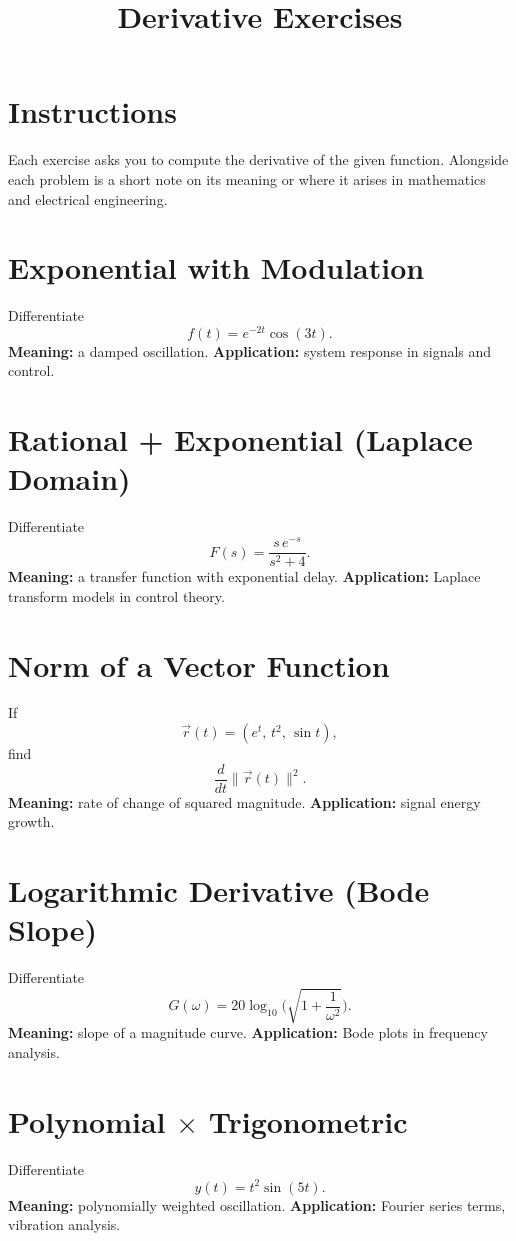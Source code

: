 \documentclass[11pt,a4paper]{article}
\title{Derivative Exercises}
\author{}
\date{}
\begin{document}
	\maketitle
	
	\section*{Instructions}
	Each exercise asks you to compute the derivative of the given function.
	Alongside each problem is a short note on its meaning or where it arises
	in mathematics and electrical engineering.
	
	\bigskip
	
	\section{Exponential with Modulation}
	Differentiate
	$$
	f(t) = e^{-2t}\cos(3t).
	$$
	\textbf{Meaning:} a damped oscillation.  
	\textbf{Application:} system response in signals and control.
	
	\section{Rational + Exponential (Laplace Domain)}
	Differentiate
	$$
	F(s) = \frac{s\,e^{-s}}{s^2+4}.
	$$
	\textbf{Meaning:} a transfer function with exponential delay.  
	\textbf{Application:} Laplace transform models in control theory.
	
	\section{Norm of a Vector Function}
	If
	$$
	\vec{r}(t) = (e^t,\, t^2,\, \sin t),
	$$
	find
	$$
	\frac{d}{dt}\|\vec{r}(t)\|^2.
	$$
	\textbf{Meaning:} rate of change of squared magnitude.  
	\textbf{Application:} signal energy growth.
	
	\section{Logarithmic Derivative (Bode Slope)}
	Differentiate
	$$
	G(\omega) = 20\log_{10}\!\Bigg(\sqrt{1+\frac{1}{\omega^2}}\Bigg).
	$$
	\textbf{Meaning:} slope of a magnitude curve.  
	\textbf{Application:} Bode plots in frequency analysis.
	
	\section{Polynomial $\times$ Trigonometric}
	Differentiate
	$$
	y(t) = t^2 \sin(5t).
	$$
	\textbf{Meaning:} polynomially weighted oscillation.  
	\textbf{Application:} Fourier series terms, vibration analysis.
	
\end{document}
